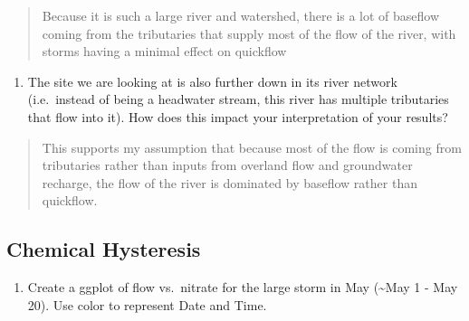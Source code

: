 \documentclass[]{article}
\newenvironment{Shaded}{\begin{snugshade}}{\end{snugshade}}
\newcommand{\DataTypeTok}[1]{\textcolor[rgb]{0.13,0.29,0.53}{#1}}
\newcommand{\DecValTok}[1]{\textcolor[rgb]{0.00,0.00,0.81}{#1}}
\newcommand{\KeywordTok}[1]{\textcolor[rgb]{0.13,0.29,0.53}{\textbf{#1}}}
\newcommand{\NormalTok}[1]{#1}
\newcommand{\OperatorTok}[1]{\textcolor[rgb]{0.81,0.36,0.00}{\textbf{#1}}}
\newcommand{\StringTok}[1]{\textcolor[rgb]{0.31,0.60,0.02}{#1}}
\providecommand{\tightlist}{%
  \setlength{\itemsep}{0pt}\setlength{\parskip}{0pt}}
\begin{document}
\begin{quote}
Because it is such a large river and watershed, there is a lot of
baseflow coming from the tributaries that supply most of the flow of the
river, with storms having a minimal effect on quickflow
\end{quote}

\begin{enumerate}
\def\labelenumi{\arabic{enumi}.}
\setcounter{enumi}{12}
\tightlist
\item
  The site we are looking at is also further down in its river network
  (i.e.~instead of being a headwater stream, this river has multiple
  tributaries that flow into it). How does this impact your
  interpretation of your results?
\end{enumerate}

\begin{quote}
This supports my assumption that because most of the flow is coming from
tributaries rather than inputs from overland flow and groundwater
recharge, the flow of the river is dominated by baseflow rather than
quickflow.
\end{quote}

\hypertarget{chemical-hysteresis}{%
\subsection{Chemical Hysteresis}\label{chemical-hysteresis}}

\begin{enumerate}
\def\labelenumi{\arabic{enumi}.}
\setcounter{enumi}{13}
\tightlist
\item
  Create a ggplot of flow vs.~nitrate for the large storm in May
  (\textasciitilde{}May 1 - May 20). Use color to represent Date and
  Time.
\end{enumerate}

\begin{Shaded}
\end{Shaded}
\end{document}
